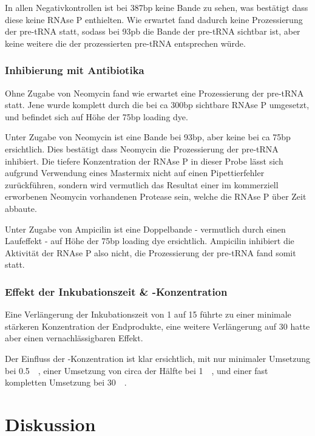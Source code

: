 \documentclass[a4paper,english]{scrreprt}
\begin{document}
In allen Negativkontrollen ist bei 387bp keine Bande zu sehen, was bestätigt
dass diese keine RNAse P enthielten. Wie erwartet fand dadurch keine
Prozessierung der pre-tRNA statt, sodass bei 93pb die Bande der pre-tRNA
sichtbar ist, aber keine weitere die der prozessierten pre-tRNA entsprechen
würde.

\subsection{Inhibierung mit Antibiotika}

Ohne Zugabe von Neomycin fand wie erwartet eine Prozessierung der pre-tRNA
statt. Jene wurde komplett durch die bei ca 300bp sichtbare RNAse P umgesetzt,
und befindet sich auf Höhe der 75bp loading dye.

Unter Zugabe von Neomycin ist eine Bande bei 93bp, aber keine bei ca 75bp
ersichtlich. Dies bestätigt dass Neomycin die Prozessierung der pre-tRNA
inhibiert. Die tiefere Konzentration der RNAse P in dieser Probe lässt sich
aufgrund Verwendung eines Mastermix nicht auf einen Pipettierfehler
zurückführen, sondern wird vermutlich das Resultat einer im kommerziell
erworbenen Neomycin vorhandenen Protease sein, welche die RNAse P über Zeit
abbaute.

Unter Zugabe von Ampicilin ist eine Doppelbande - vermutlich durch einen
Laufeffekt - auf Höhe der 75bp loading dye ersichtlich. Ampicilin inhibiert die
Aktivität der RNAse P also nicht, die Prozessierung der pre-tRNA fand somit
statt.

\subsection{Effekt der Inkubationszeit \& -Konzentration}

Eine Verlängerung der Inkubationszeit von \SI{1}{\min} auf \SI{15}{\min} führte
zu einer minimale stärkeren Konzentration der Endprodukte, eine weitere
Verlängerung auf \SI{30}{\min} hatte aber einen vernachlässigbaren Effekt.

Der Einfluss der -Konzentration ist klar ersichtlich, mit nur minimaler
Umsetzung bei \SI{0.5}{\milli\Molar}, einer Umsetzung von circa der Hälfte bei
\SI{1}{\milli\Molar}, und einer fast kompletten Umsetzung bei
\SI{30}{\milli\Molar}.

\chapter{Diskussion}
\end{document}
